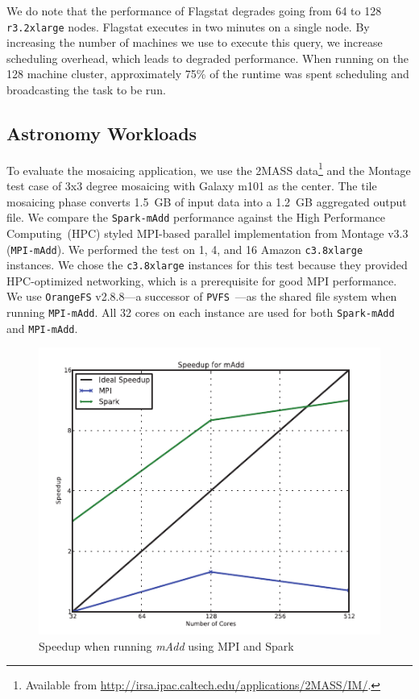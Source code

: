 \documentclass{acm_proc_article-sp}
\begin{document}
We do note that the performance of Flagstat degrades going from 64 to 128 \texttt{r3.2xlarge} nodes.
Flagstat executes in two minutes on a single node. By increasing the number of machines
we use to execute this query, we increase scheduling overhead, which leads to degraded
performance. When running on the 128 machine cluster, approximately 75\% of the runtime was spent
scheduling and broadcasting the task to be run.

\subsection{Astronomy Workloads}
\label{sec:astro-workloads}

To evaluate the mosaicing application, we use the 2MASS data\footnote{Available from
\url{http://irsa.ipac.caltech.edu/applications/2MASS/IM/}.} and the Montage test case of 3x3 degree
mosaicing with Galaxy m101 as the center. The tile mosaicing phase converts 1.5~GB of input data into a
1.2~GB aggregated output file. We compare the \texttt{Spark-mAdd} performance against the High Performance
Computing~(HPC) styled MPI-based parallel implementation from Montage v3.3 (\texttt{MPI-mAdd}). We
performed the test on 1, 4, and 16 Amazon \texttt{c3.8xlarge} instances. We chose the \texttt{c3.8xlarge} instances
for this test because they provided HPC-optimized networking, which is a prerequisite for good MPI performance.
We use \texttt{OrangeFS} v2.8.8---a successor of \texttt{PVFS}~\cite{PVFS}---as the shared file system when running
\texttt{MPI-mAdd}. All 32 cores on each instance are used for both \texttt{Spark-mAdd} and \texttt{MPI-mAdd}.

\begin{figure}[h]
\begin{center}
\includegraphics{graphs/speedup_madd.pdf}
\end{center}
\caption{Speedup when running \textit{mAdd} using MPI and Spark}
\label{fig:madd-speedup}
\end{figure}
\end{document}
